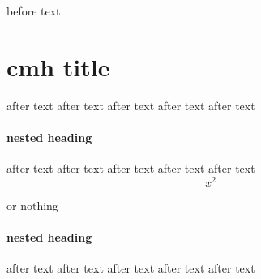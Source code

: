 before text

\section{cmh title}
after text
after text
after text
after text
after text

\paragraph{nested heading}

after text
after text
after text
after text
after text
\[
  x^2
\]
\begin{something}[optional]
  or nothing
\end{something}

\paragraph{nested heading}

after text
after text
after text
after text
after text
